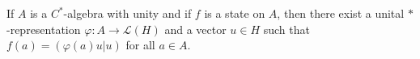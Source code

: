 If $A$ is a $C^*$-algebra with unity and if $f$ is a state on $A$, then there exist a unital $*$-representation $\varphi: A \to \mathcal{L}(H)$ and a vector $u \in H$ such that $f(a) = (\varphi(a)u|u)$ for all $a \in A$.
